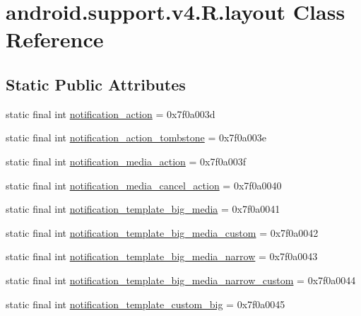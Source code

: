 \hypertarget{classandroid_1_1support_1_1v4_1_1R_1_1layout}{}\section{android.\+support.\+v4.\+R.\+layout Class Reference}
\label{classandroid_1_1support_1_1v4_1_1R_1_1layout}
\subsection*{Static Public Attributes}
\begin{DoxyCompactItemize}
\item 
static final int \mbox{\hyperlink{classandroid_1_1support_1_1v4_1_1R_1_1layout_ac1411f1001043a2b326b906b8ff45fea}{notification\+\_\+action}} = 0x7f0a003d
\item 
static final int \mbox{\hyperlink{classandroid_1_1support_1_1v4_1_1R_1_1layout_acb294013b8cd2a08ae0dffd96c702fdb}{notification\+\_\+action\+\_\+tombstone}} = 0x7f0a003e
\item 
static final int \mbox{\hyperlink{classandroid_1_1support_1_1v4_1_1R_1_1layout_aca36a79f5eadb59146515ffed73c3777}{notification\+\_\+media\+\_\+action}} = 0x7f0a003f
\item 
static final int \mbox{\hyperlink{classandroid_1_1support_1_1v4_1_1R_1_1layout_ae93bfe9691889264f234cdad70289374}{notification\+\_\+media\+\_\+cancel\+\_\+action}} = 0x7f0a0040
\item 
static final int \mbox{\hyperlink{classandroid_1_1support_1_1v4_1_1R_1_1layout_a4532849f97a2ea66c7969abe576d998d}{notification\+\_\+template\+\_\+big\+\_\+media}} = 0x7f0a0041
\item 
static final int \mbox{\hyperlink{classandroid_1_1support_1_1v4_1_1R_1_1layout_a26f42a4c35af6add5b7cef3a03008f5f}{notification\+\_\+template\+\_\+big\+\_\+media\+\_\+custom}} = 0x7f0a0042
\item 
static final int \mbox{\hyperlink{classandroid_1_1support_1_1v4_1_1R_1_1layout_a8ce4e8b413c5345c2d47fc68c465a5ee}{notification\+\_\+template\+\_\+big\+\_\+media\+\_\+narrow}} = 0x7f0a0043
\item 
static final int \mbox{\hyperlink{classandroid_1_1support_1_1v4_1_1R_1_1layout_a3f1c19efb3b6a1d34c0b4a6e3d8eaab8}{notification\+\_\+template\+\_\+big\+\_\+media\+\_\+narrow\+\_\+custom}} = 0x7f0a0044
\item 
static final int \mbox{\hyperlink{classandroid_1_1support_1_1v4_1_1R_1_1layout_a67bb31b5622bc564c3af959470bab5b4}{notification\+\_\+template\+\_\+custom\+\_\+big}} = 0x7f0a0045

\end{DoxyCompactItemize}
